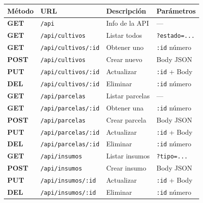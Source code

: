 \documentclass[12pt, a4paper]{article}
\newcommand{\httpGET}  {\colorbox{azulCl}{\color{azulAPI}\textbf{\ttfamily GET}}}
\newcommand{\httpPOST} {\colorbox{verdeCl}{\color{verdeAgro}\textbf{\ttfamily POST}}}
\newcommand{\httpPUT}  {\colorbox{ambarCl}{\color{ambarDB}\textbf{\ttfamily PUT}}}
\newcommand{\httpDEL}  {\colorbox{rojoCl}{\color{rojoDel}\textbf{\ttfamily DEL}}}
\begin{document}
\begin{center}
\begin{tabular}{>{\centering\arraybackslash}p{1.8cm} p{5cm} p{4cm} p{3.5cm}}
  \toprule
  \rowcolor{grisCl}
  \textbf{Método} & \textbf{URL} & \textbf{Descripción} & \textbf{Parámetros} \\
  \midrule
  \httpGET  & \texttt{/api}                    & Info de la API          & --- \\
  \httpGET  & \texttt{/api/cultivos}            & Listar todos            & \texttt{?estado=...} \\
  \httpGET  & \texttt{/api/cultivos/:id}        & Obtener uno             & \texttt{:id} número \\
  \httpPOST & \texttt{/api/cultivos}            & Crear nuevo             & Body JSON \\
  \httpPUT  & \texttt{/api/cultivos/:id}        & Actualizar              & \texttt{:id} + Body \\
  \httpDEL  & \texttt{/api/cultivos/:id}        & Eliminar                & \texttt{:id} número \\
  \midrule
  \httpGET  & \texttt{/api/parcelas}            & Listar parcelas         & --- \\
  \httpGET  & \texttt{/api/parcelas/:id}        & Obtener una             & \texttt{:id} número \\
  \httpPOST & \texttt{/api/parcelas}            & Crear parcela           & Body JSON \\
  \httpPUT  & \texttt{/api/parcelas/:id}        & Actualizar              & \texttt{:id} + Body \\
  \httpDEL  & \texttt{/api/parcelas/:id}        & Eliminar                & \texttt{:id} número \\
  \midrule
  \httpGET  & \texttt{/api/insumos}             & Listar insumos          & \texttt{?tipo=...} \\
  \httpPOST & \texttt{/api/insumos}             & Crear insumo            & Body JSON \\
  \httpPUT  & \texttt{/api/insumos/:id}         & Actualizar              & \texttt{:id} + Body \\
  \httpDEL  & \texttt{/api/insumos/:id}         & Eliminar                & \texttt{:id} número \\
  \bottomrule
\end{tabular}
\end{center}

\end{document}
